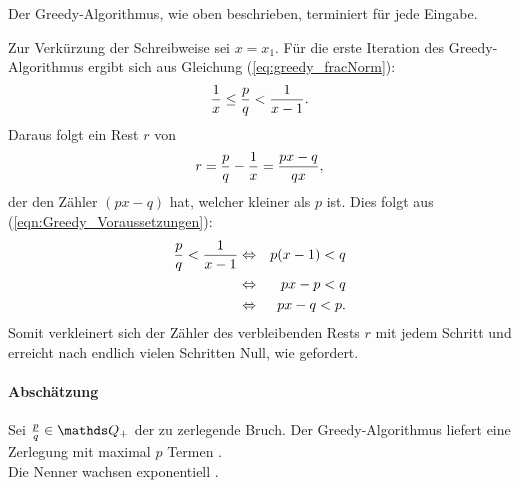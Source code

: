 \begin{satz}
	Der Greedy-Algorithmus, wie oben beschrieben, terminiert für jede Eingabe.
\end{satz}
\begin{bew}
	Zur Verkürzung der Schreibweise sei  $x = x_1$.
	Für die erste Iteration des Greedy-Algorithmus ergibt sich aus Gleichung (\ref{eq:greedy_fracNorm}):
	\begin{equation}\label{eqn:Greedy_Voraussetzungen}
		\frac{1}{x} \leq \frac{p}{q} < \frac{1}{x-1}.
	\end{equation}
	Daraus folgt ein Rest $r$ von
	$$ r = \frac{p}{q}-\frac{1}{x} = \frac{px-q}{qx},$$
	der den Zähler $(px-q)$ hat, welcher kleiner als $p$ ist. Dies folgt aus (\ref{eqn:Greedy_Voraussetzungen}):
	\begin{eqnarray*}
		\frac{p}{q} < \frac{1}{x-1}& \Leftrightarrow & p(x-1)<q\\
		& \Leftrightarrow & px-p < q\\
		& \Leftrightarrow & px-q < p.\\
	\end{eqnarray*}
	Somit verkleinert sich der Zähler des verbleibenden Rests $r$ mit jedem Schritt und erreicht nach endlich vielen Schritten Null, wie gefordert.
\end{bew}

\paragraph{Abschätzung} Sei $\frac{p}{q} \in \Q_+$ der zu zerlegende Bruch. Der Greedy-Algorithmus liefert eine Zerlegung mit maximal $p$ Termen \cite[S.7]{Gong1992}.\\
Die Nenner wachsen exponentiell \cite[S.157]{BleicherErdoes1976}.